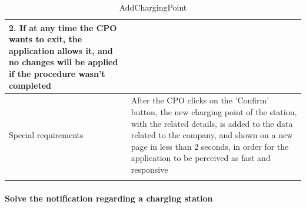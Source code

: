 \begin{center}
\begin{longtable}{p{4cm} p{11cm}}
                    2. If at any time the CPO wants to exit, the application allows it, and no changes will be applied if the procedure wasn't completed \\
     \hline
     Special requirements & After the CPO clicks on the 'Confirm' button, the new charging point of the station, with the related details, is added to the data related to the company, and shown on a new page in less than 2 seconds, in order for the application to be perceived as fast and responsive \\
     \hline
    \caption{AddChargingPoint}
    \label{tab:AddChargingPoint}
    \end{longtable}
\end{center}

\paragraph{Solve the notification regarding a charging station}
